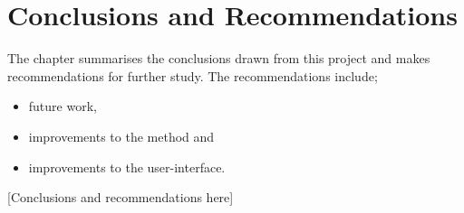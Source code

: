 \chapter{Conclusions and Recommendations}\label{chap:conclusion}
\begin{overview}
  The chapter summarises the conclusions drawn from this project and makes 
  recommendations for further study. The recommendations include;
  \begin{itemize}
    \item future work,
    \item improvements to the method and
    \item improvements to the user-interface. 
  \end{itemize}
\end{overview}

[Conclusions and recommendations here]

